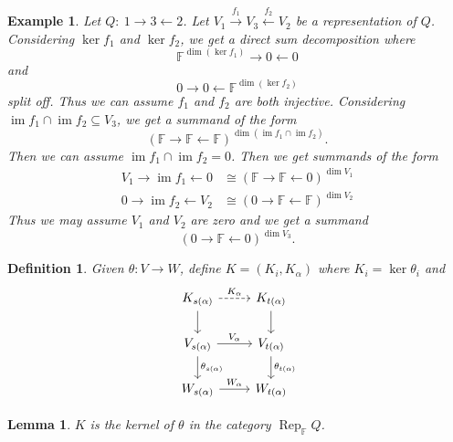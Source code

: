 \documentclass{book}
\newtheorem{lemma}[theorem]{Lemma}
\newtheorem{definition}[theorem]{Definition}
\newtheorem{example}{Example}[section]
\DeclareMathOperator{\Rep}{Rep}
\DeclareMathOperator{\im}{im}
\begin{document}
		\begin{example}
			Let $Q: \ 1\to3\leftarrow 2$. Let $V_1 \xrightarrow{f_1} V_3 \xleftarrow{f_2} V_2$ be a representation of $Q$. Considering $\ker f_1$ and $\ker f_2$, we get a direct sum decomposition where  $$\mathbb{F}^{\dim(\ker f_1)} \rightarrow 0 \leftarrow 0$$ and $$ 0\rightarrow 0 \leftarrow \mathbb{F}^{\dim(\ker f_2)}$$ split off. Thus we can assume $f_1$ and $f_2$ are both injective. Considering $\im f_1\cap \im f_2 \subseteq V_3$, we get a summand of the form \[(\mathbb{F}\rightarrow\mathbb{F}\leftarrow\mathbb{F})^{\dim(\im f_1\cap \im f_2)}.\] Then we can assume $\im f_1\cap \im f_2=0$. Then we get summands of the form 
			\begin{align*} V_1\rightarrow\im f_1 \leftarrow 0 &\cong (\mathbb{F}\rightarrow\mathbb{F}\leftarrow 0)^{\dim V_1} \\ 0\rightarrow\im f_2 \leftarrow V_2 &\cong (0 \rightarrow\mathbb{F}\leftarrow\mathbb{F})^{\dim V_2} \end{align*}
			Thus we may assume $V_1$ and $V_2$ are zero and we get a summand \[(0 \rightarrow\mathbb{F}\leftarrow0)^{\dim V_3}. \]
		\end{example}
		
		\begin{definition}
			Given $\theta:V\to W$, define $K=(K_i,K_\alpha)$ where $K_i=\ker\theta_i$ and \[ \begin{tikzcd}
		K_{s(\alpha)} \arrow[dashed]{r}{K_\alpha} \arrow{d} & K_{t(\alpha)} \arrow{d}\\
		V_{s(\alpha)} \arrow{r}{V_\alpha} \arrow{d}{\theta_{s(\alpha)}} & V_{t(\alpha)} \arrow{d}{\theta_{t(\alpha)}}\\
		W_{s(\alpha)} \arrow{r}{W_\alpha}& W_{t(\alpha)}
		\end{tikzcd}\]
		\end{definition}
		
		\begin{lemma}
			$K$ is the kernel of $\theta$ in the category $\Rep_\mathbb{F}Q$.
		\end{lemma}
\end{document}
